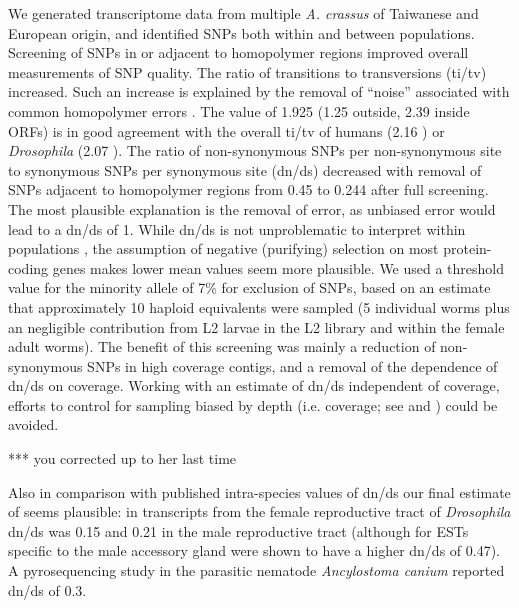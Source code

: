 \documentclass[10pt]{bmc_article}
\newenvironment{bmcformat}{\begin{raggedright}\baselineskip20pt\sloppy\setboolean{publ}{false}}{\end{raggedright}\baselineskip20pt\sloppy}
\begin{document}
\begin{bmcformat}
We generated transcriptome data from multiple \textit{A. crassus} of
Taiwanese and European origin, and identified SNPs both within and
between populations. Screening of SNPs in or adjacent to homopolymer
regions improved overall measurements of SNP quality. The ratio of
transitions to transversions (ti/tv) increased. Such an increase is
explained by the removal of “noise” associated with common homopolymer
errors \cite{pmid21685085}. The value of
1.925 (1.25 outside,
2.39 inside ORFs) is in good agreement with the
overall ti/tv of humans (2.16 \cite{pmid21169219}) or
\textit{Drosophila} (2.07 \cite{pmid21143862}). The ratio of
non-synonymous SNPs per non-synonymous site to synonymous SNPs per
synonymous site (dn/ds) decreased with removal of SNPs adjacent to
homopolymer regions from 0.45 to
0.244 after full screening. The most
plausible explanation is the removal of error, as unbiased error would
lead to a dn/ds of 1. While dn/ds is not unproblematic to interpret
within populations \cite{pmid19081788}, the assumption of negative
(purifying) selection on most protein-coding genes makes lower mean
values seem more plausible. We used a threshold value for the minority
allele of 7\% for exclusion of SNPs, based on an estimate that
approximately 10 haploid equivalents were sampled (5 individual worms
plus an negligible contribution from L2 larvae in the L2 library and
within the female adult worms). The benefit of this screening was
mainly a reduction of non-synonymous SNPs in high coverage contigs,
and a removal of the dependence of dn/ds on coverage. Working with an
estimate of dn/ds independent of coverage, efforts to control for
sampling biased by depth (i.e. coverage; see \cite{pmid18590545} and
\cite{pmid20478048}) could be avoided.

*** you corrected up to her last time

Also in comparison with published intra-species values of dn/ds our
final estimate of seems plausible: in transcripts from the female
reproductive tract of \textit{Drosophila} dn/ds was 0.15
\cite{pmid15579698} and 0.21 in the male reproductive tract
\cite{pmid11404480} (although for ESTs specific to the male accessory
gland were shown to have a higher dn/ds of 0.47). A pyrosequencing
study in the parasitic nematode \textit{Ancylostoma canium}
\cite{pmid20470405} reported dn/ds of 0.3.


\end{bmcformat}
\end{document}
